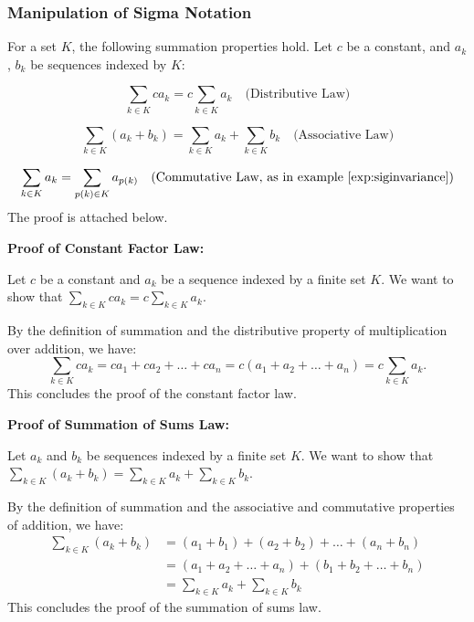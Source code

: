 \documentclass[
	12pt, %
	fleqn, %
	a4paper, %
]{LegrandOrangeBook}
\begin{document}
\subsubsection{Manipulation of Sigma Notation}
For a set \( K \), the following summation properties hold. Let \( c \) be a constant, and \( a_k \), \( b_k \) be sequences indexed by \( K \):

\begin{equation}
    \sum_{k \in K} c a_k = c \sum_{k \in K} a_k \quad \text{(Distributive Law)}
    \label{eq:constant_factor}
\end{equation}

\begin{equation}
    \sum_{k \in K} (a_k + b_k) = \sum_{k \in K} a_k + \sum_{k \in K} b_k \quad \text{(Associative Law)}
    \label{eq:summation_of_sums}
\end{equation}

\begin{equation}
    \sum_{k \in K} a_k = \sum_{p(k) \in K} a_{p(k)} \quad \text{(Commutative Law, as in example \autoref{exp:siginvariance})} 
    \label{eq:permutation_invariance}
\end{equation}
The proof is attached below.

\textbf{Proof of Constant Factor Law:}

Let \( c \) be a constant and \( a_k \) be a sequence indexed by a finite set \( K \). We want to show that \( \sum_{k \in K} c a_k = c \sum_{k \in K} a_k \).

By the definition of summation and the distributive property of multiplication over addition, we have:
\begin{equation}
    \sum_{k \in K} c a_k = c a_1 + c a_2 + \ldots + c a_n = c (a_1 + a_2 + \ldots + a_n) = c \sum_{k \in K} a_k.
\end{equation}
This concludes the proof of the constant factor law.

\textbf{Proof of Summation of Sums Law:}

Let \( a_k \) and \( b_k \) be sequences indexed by a finite set \( K \). We want to show that \( \sum_{k \in K} (a_k + b_k) = \sum_{k \in K} a_k + \sum_{k \in K} b_k \).

By the definition of summation and the associative and commutative properties of addition, we have:
\begin{equation}
    \begin{split}
\sum_{k \in K} (a_k + b_k) &= (a_1 + b_1) + (a_2 + b_2) + \ldots + (a_n + b_n) \\
&= (a_1 + a_2 + \ldots + a_n) + (b_1 + b_2 + \ldots + b_n) \\
&= \sum_{k \in K} a_k + \sum_{k \in K} b_k
\end{split}
\label{eq:sum_of_sums}
\end{equation}
This concludes the proof of the summation of sums law.
\end{document}

